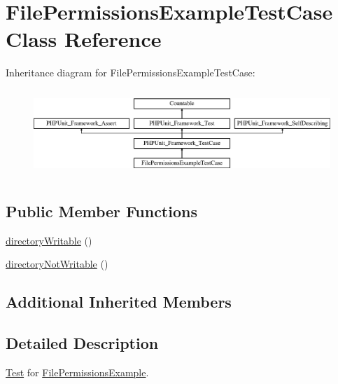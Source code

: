 \hypertarget{classorg_1_1bovigo_1_1vfs_1_1example_1_1_file_permissions_example_test_case}{}\section{File\+Permissions\+Example\+Test\+Case Class Reference}
\label{classorg_1_1bovigo_1_1vfs_1_1example_1_1_file_permissions_example_test_case}
Inheritance diagram for File\+Permissions\+Example\+Test\+Case\+:\begin{figure}[H]
\begin{center}
\leavevmode
\includegraphics[height=3.303835cm]{classorg_1_1bovigo_1_1vfs_1_1example_1_1_file_permissions_example_test_case}
\end{center}
\end{figure}
\subsection*{Public Member Functions}
\begin{DoxyCompactItemize}
\item 
\mbox{\hyperlink{classorg_1_1bovigo_1_1vfs_1_1example_1_1_file_permissions_example_test_case_aa9ba6c1d16a2be31af07dce9150ee635}{directory\+Writable}} ()
\item 
\mbox{\hyperlink{classorg_1_1bovigo_1_1vfs_1_1example_1_1_file_permissions_example_test_case_a2751e09021d8d66cd33b4d36dd7cdedc}{directory\+Not\+Writable}} ()
\end{DoxyCompactItemize}
\subsection*{Additional Inherited Members}


\subsection{Detailed Description}
\mbox{\hyperlink{class_test}{Test}} for \mbox{\hyperlink{classorg_1_1bovigo_1_1vfs_1_1example_1_1_file_permissions_example}{File\+Permissions\+Example}}. 

